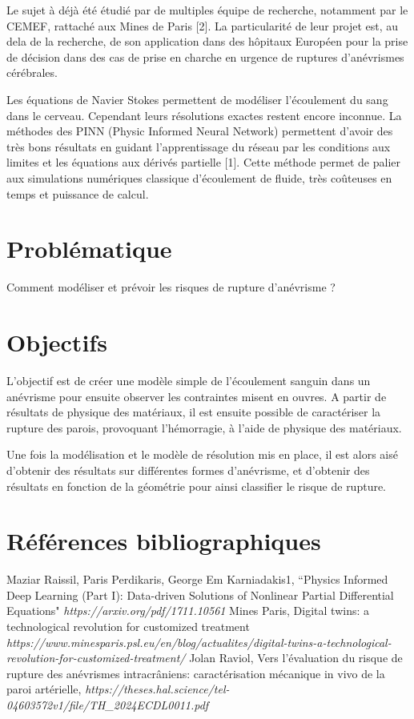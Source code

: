 \documentclass{article}
\begin{document}
Le sujet à déjà été étudié par de multiples équipe de recherche, notamment par le CEMEF, rattaché aux Mines de Paris [2]. La particularité de leur projet est, au dela de la recherche, de son application dans des hôpitaux Européen pour la prise de décision dans des cas de prise en charche en urgence de ruptures d'anévrismes cérébrales.

Les équations de Navier Stokes permettent de modéliser l'écoulement du sang dans le cerveau. Cependant leurs résolutions exactes restent encore inconnue. La méthodes des PINN (Physic Informed Neural Network) permettent d'avoir des très bons résultats en guidant l'apprentissage du réseau par les conditions aux limites et les équations aux dérivés partielle [1]. Cette méthode permet de palier aux simulations numériques classique d'écoulement de fluide, très coûteuses en temps et puissance de calcul.
	
	\section{Problématique}	
	
Comment modéliser et prévoir les risques de rupture d'anévrisme ?
	
	\section{Objectifs}
	
L'objectif est de créer une modèle simple de l'écoulement sanguin dans un anévrisme pour ensuite observer les contraintes misent en ouvres. A partir de résultats de physique des matériaux, il est ensuite possible de caractériser la rupture des parois, provoquant l'hémorragie, à l'aide de physique des matériaux.

Une fois la modélisation et le modèle de résolution mis en place, il est alors aisé d'obtenir des résultats sur différentes formes d'anévrisme, et d'obtenir des résultats en fonction de la géométrie pour ainsi classifier le risque de rupture. 
	
	\section{Références bibliographiques}
	
	\begin{thebibliography}{2} %

	\bibitem{} Maziar Raissil, Paris Perdikaris, George Em Karniadakis1, ``Physics Informed Deep Learning (Part I): Data-driven Solutions of Nonlinear Partial Differential Equations" \emph{https://arxiv.org/pdf/1711.10561}
	\bibitem{} Mines Paris, Digital twins: a technological revolution for customized treatment \emph{https://www.minesparis.psl.eu/en/blog/actualites/digital-twins-a-technological-revolution-for-customized-treatment/}
	\bibitem{} Jolan Raviol, Vers l’évaluation du risque de rupture des anévrismes
intracrâniens: caractérisation mécanique in vivo de la
paroi artérielle, \emph{https://theses.hal.science/tel-04603572v1/file/TH_2024ECDL0011.pdf}
	
\end{thebibliography}
\end{document}
